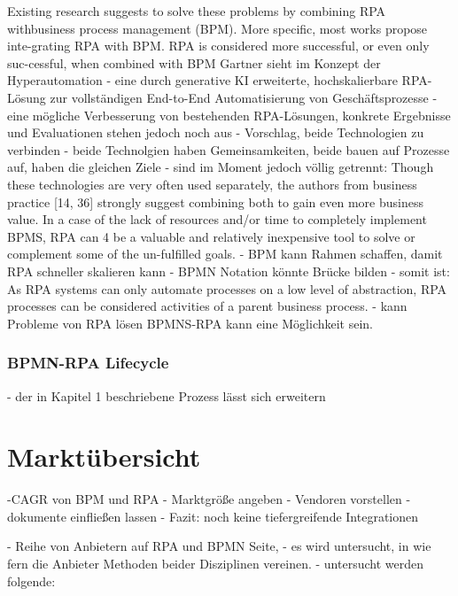     Existing research suggests to solve these problems by combining RPA withbusiness process management (BPM). More speciﬁc, most works propose inte-grating RPA with BPM. RPA is considered more successful, or even only suc-cessful, when combined with BPM
    Gartner sieht im Konzept der Hyperautomation - eine durch generative KI erweiterte, hochskalierbare RPA-Lösung zur vollständigen End-to-End Automatisierung von Geschäftsprozesse - eine mögliche Verbesserung von bestehenden RPA-Lösungen, konkrete Ergebnisse und Evaluationen stehen jedoch noch aus 
- Vorschlag, beide Technologien zu verbinden
- beide Technolgien haben Gemeinsamkeiten, beide bauen auf Prozesse auf, haben die gleichen Ziele
- sind im Moment jedoch völlig getrennt: Though these technologies are very often used separately, the authors from business practice [14, 36] strongly suggest combining both to gain even more business value. In a case of the lack of resources and/or time to completely implement BPMS, RPA can
4 be a valuable and relatively inexpensive tool to solve or complement some of the un-fulfilled goals.
- BPM kann Rahmen schaffen, damit RPA schneller skalieren kann
- BPMN Notation könnte Brücke bilden
- somit ist: As RPA systems can only automate processes on a low level
of abstraction, RPA processes can be considered activities of a parent business
process.
- kann Probleme von RPA lösen
BPMNS-RPA kann eine Möglichkeit sein.
\subsection{BPMN-RPA Lifecycle}
- der in Kapitel 1 beschriebene Prozess lässt sich erweitern

\chapter{Marktübersicht}
-CAGR von BPM und RPA
- Marktgröße angeben
- Vendoren vorstellen
- dokumente einfließen lassen
- Fazit: noch keine tiefergreifende Integrationen

- Reihe von Anbietern auf RPA und BPMN Seite,
- es wird untersucht, in wie fern die Anbieter Methoden beider Disziplinen vereinen.
- untersucht werden folgende:

